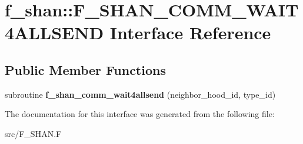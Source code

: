 \hypertarget{interfacef__shan_1_1F__SHAN__COMM__WAIT4ALLSEND}{}\section{f\+\_\+shan\+:\+:F\+\_\+\+S\+H\+A\+N\+\_\+\+C\+O\+M\+M\+\_\+\+W\+A\+I\+T4\+A\+L\+L\+S\+E\+ND Interface Reference}
\label{interfacef__shan_1_1F__SHAN__COMM__WAIT4ALLSEND}
\subsection*{Public Member Functions}
\begin{DoxyCompactItemize}
\item 
subroutine {\bfseries f\+\_\+shan\+\_\+comm\+\_\+wait4allsend} (neighbor\+\_\+hood\+\_\+id, type\+\_\+id)\hypertarget{interfacef__shan_1_1F__SHAN__COMM__WAIT4ALLSEND_ab629b92878a371d6f52b4fdfe0a0808c}{}\label{interfacef__shan_1_1F__SHAN__COMM__WAIT4ALLSEND_ab629b92878a371d6f52b4fdfe0a0808c}

\end{DoxyCompactItemize}


The documentation for this interface was generated from the following file\+:\begin{DoxyCompactItemize}
\item 
src/F\+\_\+\+S\+H\+A\+N.\+F\end{DoxyCompactItemize}
